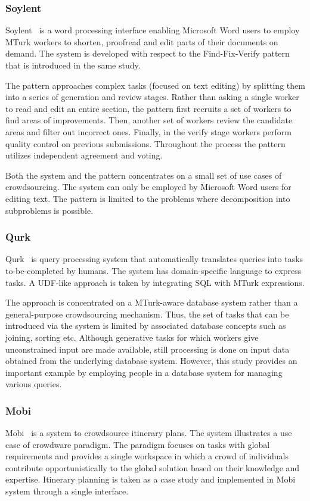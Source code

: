 \subsubsection{Soylent}
Soylent~\cite{Bernstein2010} is a word processing interface enabling Microsoft Word 
users to employ MTurk workers to shorten, proofread and edit parts of their 
documents on demand. The system is developed with respect to the 
Find-Fix-Verify pattern that is introduced in the same study.

The pattern approaches complex tasks (focused on text editing) by splitting them 
into a series of generation and review stages. Rather than asking a single worker 
to read and edit an entire section, the pattern first recruits a set of workers to 
find areas of improvements. Then, another set of workers review the candidate 
areas and filter out incorrect ones. Finally, in the verify stage workers perform 
quality control on previous submissions. Throughout the process the pattern 
utilizes independent agreement and voting.

Both the system and the pattern concentrates on a small set of use cases of 
crowdsourcing. The system can only be employed by Microsoft Word users 
for editing text. The pattern is limited to the problems where decomposition 
into subproblems is possible.

\subsubsection{Qurk}
Qurk~\cite{Marcus2011, Marcus2011b} is query processing system that 
automatically translates queries into tasks to-be-completed by humans. The system 
has domain-specific language to express tasks. A UDF-like approach is taken 
by integrating SQL with MTurk expressions.

The approach is concentrated on a MTurk-aware database system rather than 
a general-purpose crowdsourcing mechanism. Thus, the set of tasks that can be 
introduced via the system is limited by associated database concepts such as 
joining, sorting etc. Although generative tasks for which workers give unconstrained 
input are made available, still processing is done on input data obtained from the 
underlying database system. However, this study provides an important example 
by employing people in a database system for managing various queries.

\subsubsection{Mobi}
Mobi~\cite{Zhang2012} is a system to crowdsource itinerary plans. The system 
illustrates a use case of crowdware paradigm. The paradigm focuses on tasks 
with global requirements and provides a single workspace in which a crowd of 
individuals contribute opportunistically to the global solution based on their knowledge 
and expertise. Itinerary planning is taken as a case study and implemented 
in Mobi system through a single interface.

